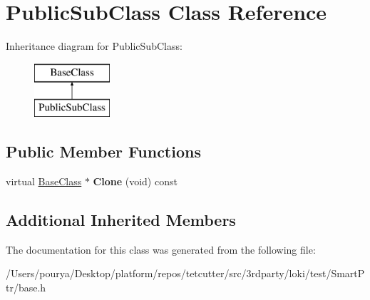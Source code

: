\hypertarget{classPublicSubClass}{}\section{Public\+Sub\+Class Class Reference}
\label{classPublicSubClass}
Inheritance diagram for Public\+Sub\+Class\+:\begin{figure}[H]
\begin{center}
\leavevmode
\includegraphics[height=2.000000cm]{classPublicSubClass}
\end{center}
\end{figure}
\subsection*{Public Member Functions}
\begin{DoxyCompactItemize}
\item 
\hypertarget{classPublicSubClass_ab89e1f8407c9375d91bc0a612bdf4eba}{}virtual \hyperlink{classBaseClass}{Base\+Class} $\ast$ {\bfseries Clone} (void) const \label{classPublicSubClass_ab89e1f8407c9375d91bc0a612bdf4eba}

\end{DoxyCompactItemize}
\subsection*{Additional Inherited Members}


The documentation for this class was generated from the following file\+:\begin{DoxyCompactItemize}
\item 
/\+Users/pourya/\+Desktop/platform/repos/tetcutter/src/3rdparty/loki/test/\+Smart\+Ptr/base.\+h\end{DoxyCompactItemize}
